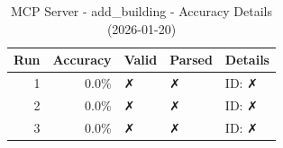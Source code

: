 \begin{table}[ht]
\centering
\small
\caption{MCP Server - add\_building - Accuracy Details (2026-01-20)}
\label{tab:mcp\_add\_building\_accuracy\_2026-01-20}
\begin{tabular}{r r l l p{6cm}}
\hline
Run & Accuracy & Valid & Parsed & Details \\
\hline
1 & 0.0\% & ✗ & ✗ & ID: ✗ \\
2 & 0.0\% & ✗ & ✗ & ID: ✗ \\
3 & 0.0\% & ✗ & ✗ & ID: ✗ \\
\hline
\end{tabular}
\end{table}
